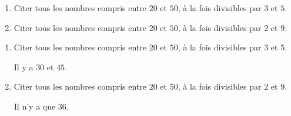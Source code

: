 \begin{exercice*}    
    \begin{enumerate}
        \item Citer tous les nombres compris entre $20$ et $50$, à la fois divisibles par $3$ et $5$.
        \item Citer tous les nombres compris entre $20$ et $50$, à la fois divisibles par $2$ et $9$.
    \end{enumerate}
\end{exercice*}
\begin{corrige}
    \begin{enumerate}
        \item Citer tous les nombres compris entre $20$ et $50$, à la fois divisibles par $3$ et $5$.
        
        Il y a $30$ et $45$.
        \item Citer tous les nombres compris entre $20$ et $50$, à la fois divisibles par $2$ et $9$.
        
        Il n'y a que $36$.
    \end{enumerate}
\end{corrige}

